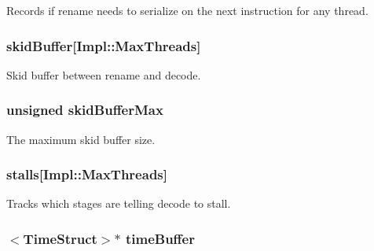 \label{classDefaultRename_a4d99bc7f86d1a17d44e59c316c273262}
Records if rename needs to serialize on the next instruction for any thread. \hypertarget{classDefaultRename_a64b861e400ea5adcf7a2f2dbe605e221}{
\subsubsection[{skidBuffer}]{ {\bf skidBuffer}\mbox{[}Impl::MaxThreads\mbox{]}}}
\label{classDefaultRename_a64b861e400ea5adcf7a2f2dbe605e221}
Skid buffer between rename and decode. \hypertarget{classDefaultRename_a268414a6444b620140f263013a739a17}{
\subsubsection[{skidBufferMax}]{\setlength{\rightskip}{0pt plus 5cm}unsigned {\bf skidBufferMax}}}
\label{classDefaultRename_a268414a6444b620140f263013a739a17}
The maximum skid buffer size. \hypertarget{classDefaultRename_ade48cf321f5741ea8e54e071680cacdc}{
\subsubsection[{stalls}]{ {\bf stalls}\mbox{[}Impl::MaxThreads\mbox{]}}}
\label{classDefaultRename_ade48cf321f5741ea8e54e071680cacdc}
Tracks which stages are telling decode to stall. \hypertarget{classDefaultRename_a83f9ee976e732665aeb08dbc19acfd45}{
\subsubsection[{timeBuffer}]{$<${\bf TimeStruct}$>$$\ast$ {\bf timeBuffer}}}
